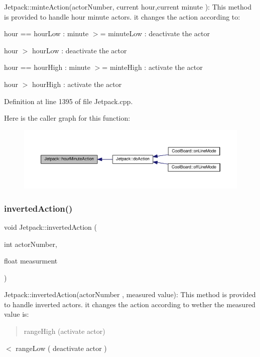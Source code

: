 Jetpack\+::minte\+Action(actor\+Number, current hour,current minute )\+: This method is provided to handle hour minute actors. it changes the action according to\+:

hour == hour\+Low \+: minute $>$= minute\+Low \+: deactivate the actor

hour $>$ hour\+Low \+: deactivate the actor

hour == hour\+High \+: minute $>$= minte\+High \+: activate the actor

hour $>$ hour\+High \+: activate the actor 

Definition at line 1395 of file Jetpack.\+cpp.

Here is the caller graph for this function\+:\nopagebreak
\begin{figure}[H]
\begin{center}
\leavevmode
\includegraphics[width=350pt]{class_jetpack_ae01c13c785ebdf1b0bb5500234aba1bd_icgraph}
\end{center}
\end{figure}
\mbox{\label{class_jetpack_adacfc35fab4a621357caf98ce1c9cb54}} 
\subsubsection{\texorpdfstring{inverted\+Action()}{invertedAction()}}
{\footnotesize\ttfamily void Jetpack\+::inverted\+Action (\begin{DoxyParamCaption}\item[{int}]{actor\+Number,  }\item[{float}]{measurment }\end{DoxyParamCaption})}

Jetpack\+::inverted\+Action(actor\+Number , measured value)\+: This method is provided to handle inverted actors. it changes the action according to wether the measured value is\+: \begin{quote}
range\+High (activate actor) \end{quote}
$<$ range\+Low ( deactivate actor ) 

